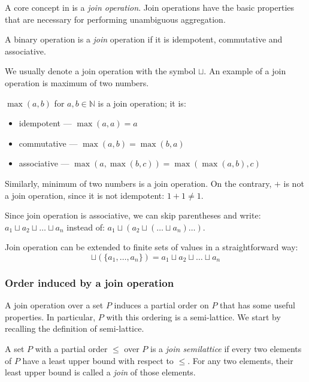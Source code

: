 A core concept in \datalogra is a \emph{join operation}. Join operations have the basic properties that are necessary for performing unambiguous aggregation.

\begin{defn}
A binary operation is a \emph{join} operation if it is idempotent, commutative and associative. 
\end{defn}

We usually denote a join operation with the symbol $\sqcup$.
An example of a join operation is maximum of two numbers.

\begin{exmp}
$\max(a, b)$ for $a, b \in \mathbb{N}$ is a join operation; it is:
\begin{itemize}
\item idempotent --- $\max(a, a) = a$
\item commutative --- $\max(a, b) = \max(b, a)$
\item associative --- $\max(a, \max(b, c)) = \max(\max(a, b), c)$
\end{itemize}

Similarly, minimum of two numbers is a join operation. On the contrary, $+$ is not a join operation, since it is not idempotent: $1+1 \ne 1$.
\end{exmp}

Since join operation is associative, we can skip parentheses and write: $ a_1 \sqcup a_2 \sqcup \dots \sqcup a_n$ instead of: $ a_1 \sqcup (a_2 \sqcup ( \dots \sqcup a_n) \dots )$.

Join operation can be extended to finite sets of values in a straightforward way:
$$\sqcup(\{a_1, \dots, a_n \}) = a_1 \sqcup a_2 \sqcup \dots \sqcup a_n$$

\subsubsection{Order induced by a join operation}

A join operation over a set $P$ induces a partial order on $P$ that has some useful properties. In particular, $P$ with this ordering is a semi-lattice. We start by recalling the definition of semi-lattice.

\begin{defn}
A set $P$ with a partial order $\le$ over $P$ is a \emph{join semilattice} if every two elements of $P$ have a least upper bound with respect to $\le$. For any two elements, their least upper bound is called a \emph{join} of those elements.
\end{defn}

